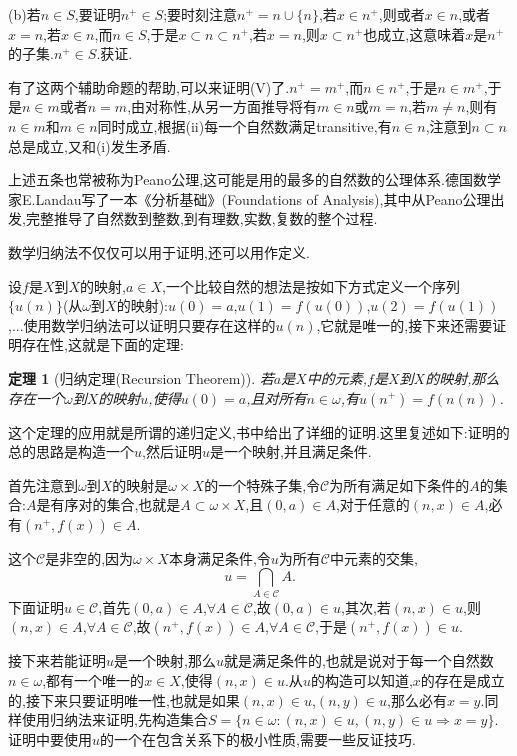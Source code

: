 \documentclass[12pt,a4paper,openany]{book}
\newtheorem{theorem}{定理}[section]
\begin{document}
(b)若$n \in S$,要证明$n^+ \in S$;要时刻注意$n^+ = n \cup \{n\}$,若$x \in n^+$,则或者$x \in n$,或者$x = n$,若$x \in n$,而$n \in S$,于是$x \subset n \subset n^+$,若$x=n$,则$x \subset n^+$也成立,这意味着$x$是$n^+$的子集.$n^+ \in S$.获证.

有了这两个辅助命题的帮助,可以来证明(V)了.$n^+=m^+$,而$n \in n^+$,于是$n \in m^+$,于是$n \in m$或者$n=m$,由对称性,从另一方面推导将有$m \in n$或$m=n$,若$m \neq n$,则有$n \in m$和$m \in n$同时成立,根据(ii)每一个自然数满足transitive,有$n \in n$,注意到$n \subset n$总是成立,又和(i)发生矛盾.

上述五条也常被称为Peano公理,这可能是用的最多的自然数的公理体系.德国数学家E.Landau写了一本《分析基础》(Foundations of Analysis),其中从Peano公理出发,完整推导了自然数到整数,到有理数,实数,复数的整个过程.

数学归纳法不仅仅可以用于证明,还可以用作定义.

设$f$是$X$到$X$的映射,$a \in X$,一个比较自然的想法是按如下方式定义一个序列$\{u(n)\}$(从$\omega$到$X$的映射):$u(0)=a$,$u(1)=f(u(0))$,$u(2)=f(u(1))$,...使用数学归纳法可以证明只要存在这样的$u(n)$,它就是唯一的,接下来还需要证明存在性,这就是下面的定理:

\begin{theorem}[归纳定理(Recursion Theorem)]
若$a$是$X$中的元素,$f$是$X$到$X$的映射,那么存在一个$\omega$到$X$的映射$u$,使得$u(0)=a$,且对所有$n \in \omega$,有$u(n^+)=f(n(n))$.
\end{theorem}

这个定理的应用就是所谓的递归定义,书中给出了详细的证明.这里复述如下:证明的总的思路是构造一个$u$,然后证明$u$是一个映射,并且满足条件.

首先注意到$\omega$到$X$的映射是$\omega \times X$的一个特殊子集,令$\mathscr{C}$为所有满足如下条件的$A$的集合:$A$是有序对的集合,也就是$A \subset \omega \times X$,且$(0,a) \in A$,对于任意的$(n,x) \in A$,必有$(n^+,f(x)) \in A$.

这个$\mathscr{C}$是非空的,因为$\omega \times X$本身满足条件,令$u$为所有$\mathscr{C}$中元素的交集,
\[
u = \bigcap_{A \in \mathscr{C}}{A}.
\]
下面证明$u \in \mathscr{C}$,首先$(0,a) \in A$,$\forall A \in \mathscr{C}$,故$(0,a) \in u$,其次,若$(n,x) \in u$,则$(n,x) \in A$,$\forall A \in \mathscr{C}$,故$(n^+,f(x)) \in A$,$\forall A \in \mathscr{C}$,于是$(n^+,f(x)) \in u$.

接下来若能证明$u$是一个映射,那么$u$就是满足条件的,也就是说对于每一个自然数$n \in \omega$,都有一个唯一的$x \in X$,使得$(n,x) \in u$.从$u$的构造可以知道,$x$的存在是成立的,接下来只要证明唯一性,也就是如果$(n,x) \in u$,$(n,y) \in u$,那么必有$x=y$.同样使用归纳法来证明,先构造集合$S = \{n \in \omega : (n,x) \in u, (n,y) \in u \Rightarrow x=y\}$.证明中要使用$u$的一个在包含关系下的极小性质,需要一些反证技巧.
\end{document}
